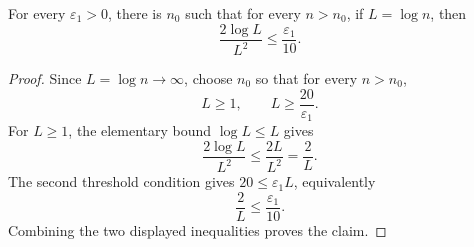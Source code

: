\begin{helper}
For every \(\varepsilon_1>0\), there is \(n_0\) such that for every
\(n>n_0\), if \(L=\log n\), then
\[
\frac{2\log L}{L^2}\le\frac{\varepsilon_1}{10}.
\]
\end{helper}
\begin{proof}
Since \(L=\log n\to\infty\), choose \(n_0\) so that for every \(n>n_0\),
\[
L\ge 1,\qquad L\ge \frac{20}{\varepsilon_1}.
\]
For \(L\ge1\), the elementary bound \(\log L\le L\) gives
\[
\frac{2\log L}{L^2}\le\frac{2L}{L^2}=\frac2L.
\]
The second threshold condition gives \(20\le\varepsilon_1 L\), equivalently
\[
\frac2L\le\frac{\varepsilon_1}{10}.
\]
Combining the two displayed inequalities proves the claim.
\end{proof}
